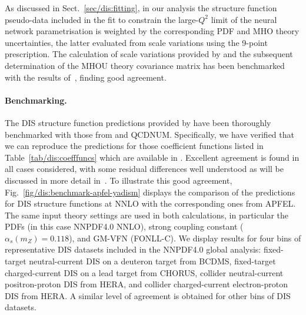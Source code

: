 As discussed in Sect.~\ref{sec/dis:fitting}, in our analysis the \yadism
structure function pseudo-data included in the fit to constrain the large-$Q^2$
limit of the neural network parametrisation is weighted by the corresponding
PDF and MHO theory uncertainties, the latter evaluated from scale variations
using the 9-point prescription.
%
The calculation of scale variations provided by \yadism and the subsequent
determination of the MHOU theory covariance matrix has been benchmarked with
the results of~\cite{NNPDF:2019ubu}, finding good agreement.

\paragraph{Benchmarking.}
%
The DIS structure function predictions provided by \yadism have been thoroughly
benchmarked  with those from \apfel and \textsc{\small QCDNUM}.
%
Specifically, we have verified that we can reproduce the \apfel
predictions for those coefficient functions listed in
Table~\ref{tab/dis:coefffuncs} which are available in \apfel.
%
Excellent agreement is found in all cases considered, with some residual
differences well understood as will be discussed in more detail
in~\cite{yadism}.
%
To illustrate this good agreement, Fig.~\ref{fig/dis:benchmark-apfel-yadism}
displays the comparison of the \yadism predictions for DIS
structure functions at NNLO with the corresponding ones from \textsc{\small
APFEL}.
%
The same input theory settings are used in both calculations, in particular the
PDFs (in this case NNPDF4.0 NNLO), strong coupling constant
($\alpha_s(m_Z)=0.118$), and GM-VFN (FONLL-C).
%
We display results for four bins of representative DIS datasets included in the
NNPDF4.0 global analysis: fixed-target neutral-current DIS on a deuteron target
from BCDMS, fixed-target charged-current DIS on a lead target from CHORUS,
collider neutral-current positron-proton DIS from HERA, and collider
charged-current electron-proton DIS from HERA.
%
A similar level of agreement is obtained for other bins of DIS datasets.

